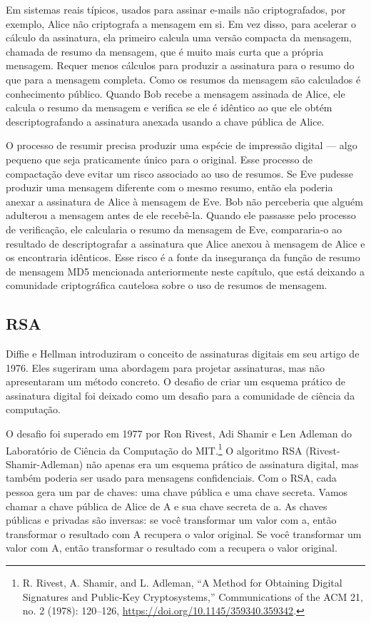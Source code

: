 \documentclass{book}
\begin{document}
Em sistemas reais típicos, usados para assinar e-mails não criptografados, por exemplo, Alice não criptografa a mensagem em si. Em vez disso, para acelerar o cálculo da assinatura, ela primeiro calcula uma versão compacta da mensagem, chamada de resumo da mensagem, que é muito mais curta que a própria mensagem. Requer menos cálculos para produzir a assinatura para o resumo do que para a mensagem completa. Como os resumos da mensagem são calculados é conhecimento público. Quando Bob recebe a mensagem assinada de Alice, ele calcula o resumo da mensagem e verifica se ele é idêntico ao que ele obtém descriptografando a assinatura anexada usando a chave pública de Alice.

O processo de resumir precisa produzir uma espécie de impressão digital --- algo pequeno que seja praticamente único para o original. Esse processo de compactação deve evitar um risco associado ao uso de resumos. Se Eve pudesse produzir uma mensagem diferente com o mesmo resumo, então ela poderia anexar a assinatura de Alice à mensagem de Eve. Bob não perceberia que alguém adulterou a mensagem antes de ele recebê-la. Quando ele passasse pelo processo de verificação, ele calcularia o resumo da mensagem de Eve, compararia-o ao resultado de descriptografar a assinatura que Alice anexou à mensagem de Alice e os encontraria idênticos. Esse risco é a fonte da insegurança da função de resumo de mensagem MD5 mencionada anteriormente neste capítulo, que está deixando a comunidade criptográfica cautelosa sobre o uso de resumos de mensagem.


\subsection{RSA}
\label{segredos:rsa}

Diffie e Hellman introduziram o conceito de assinaturas digitais em seu artigo de 1976. Eles sugeriram uma abordagem para projetar assinaturas, mas não apresentaram um método concreto. O desafio de criar um esquema prático de assinatura digital foi deixado como um desafio para a comunidade de ciência da computação.

O desafio foi superado em 1977 por Ron Rivest, Adi Shamir e Len Adleman do Laboratório de Ciência da Computação do MIT.\footnote{R. Rivest, A. Shamir, and L. Adleman, “A Method for Obtaining Digital Signatures and Public‐Key Cryptosystems,” Communications of the ACM 21, no. 2 (1978): 120–126, \url{https://doi.org/10.1145/359340.359342}.} O algoritmo RSA (Rivest-Shamir-Adleman) não apenas era um esquema prático de assinatura digital, mas também poderia ser usado para mensagens confidenciais. Com o RSA, cada pessoa gera um par de chaves: uma chave pública e uma chave secreta. Vamos chamar a chave pública de Alice de A e sua chave secreta de a. As chaves públicas e privadas são inversas: se você transformar um valor com a, então transformar o resultado com A recupera o valor original. Se você transformar um valor com A, então transformar o resultado com a recupera o valor original.
\end{document}
